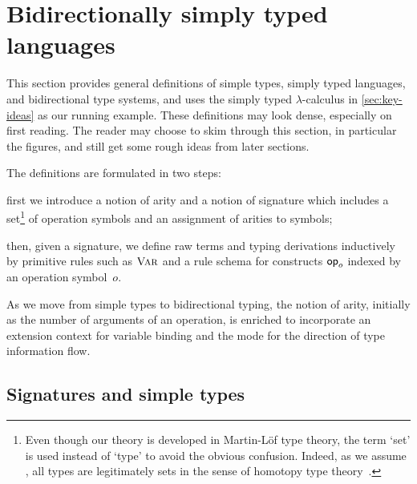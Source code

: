 
\section{Bidirectionally simply typed languages}\label{sec:defs}
This section provides general definitions
of simple types, simply typed languages, and bidirectional type systems, and uses the simply typed $\lambda$-calculus in \cref{sec:key-ideas} as our running example.
These definitions may look dense, especially on first reading.
The reader may choose to skim through this section, in particular the figures, and still get some rough ideas from later sections.

The definitions are formulated in two steps:
\begin{inlineenum}
  \item first we introduce a notion of arity and a notion of signature which includes a set\footnote{%
    Even though our theory is developed in Martin-L\"of type theory, the term `set' is used instead of `type' to avoid the obvious confusion. 
    Indeed, as we assume \AxiomK, all types are legitimately sets in the sense of homotopy type theory~\citep[Definition 3.1.1]{UFP2013}.} of operation symbols and an assignment of arities to symbols;
\item then, given a signature, we define raw terms and typing derivations inductively by primitive rules such as $\textnormal{\textsc{Var}}$ and a rule schema for constructs $\mathsf{op}_o$ indexed by an operation symbol~$o$.
\end{inlineenum}
As we move from simple types to bidirectional typing, the notion of arity, initially as the number of arguments of an operation, is enriched to incorporate an extension context for variable binding and the mode for the direction of type information flow.

\subsection{Signatures and simple types} \label{subsec:simple-types}

